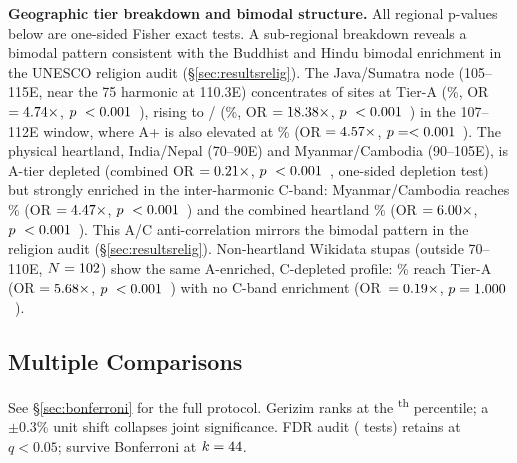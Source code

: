 \textbf{Geographic tier breakdown and bimodal structure.}
All regional p-values below are one-sided Fisher exact tests.
A sub-regional breakdown reveals a bimodal pattern consistent with the
Buddhist and Hindu bimodal enrichment in the UNESCO religion audit (\S\ref{sec:resultsrelig}).
The Java/Sumatra node (105\textdegree--115\textdegree{}E, near the 75\textdegree{} harmonic at 110.3\textdegree{}E)
concentrates \wikiJavaNodeATierN{} of \wikiJavaNodeN{} sites at Tier-A (\wikiJavaNodeATierRate\%, OR $= 4.74\times$, $p~< 0.001$~\wikiJavaNodeATierPSig{}),
rising to \wikiJavaTightATierN/\wikiJavaTightN{} (\wikiJavaTightATierRate\%, OR $= 18.38\times$, $p~< 0.001$~\wikiJavaTightATierPSig{}) in the 107\textdegree--112\textdegree{}E window,
where A+ is also elevated at \wikiJavaTightApRate\% (OR $= 4.57\times$, $p = < 0.001$~\wikiJavaTightApPSig{}).
The physical heartland, India/Nepal (70\textdegree--90\textdegree{}E) and Myanmar/Cambodia
(90\textdegree--105\textdegree{}E), is A-tier depleted (combined OR $= 0.21\times$,
$p~< 0.001$~\wikiHeartlandATierPSig{}, one-sided depletion test)
but strongly enriched in the inter-harmonic C-band:
Myanmar/Cambodia reaches \wikiMyanmarCbandRate\% (OR $= 4.47\times$, $p~< 0.001$~\wikiMyanmarCbandPSig{}) and the
combined heartland \wikiHeartlandCbandRate\% (OR $= 6.00\times$, $p~< 0.001$~\wikiHeartlandCbandPSig{}).
This A/C anti-correlation mirrors the bimodal pattern in the religion audit (\S\ref{sec:resultsrelig}).
Non-heartland Wikidata stupas (outside 70\textdegree--110\textdegree{}E,
$N = 102{}$) show the same A-enriched, C-depleted profile:
\wikiNonHeartlandATierRate\% reach Tier-A (OR $= 5.68\times$, $p~< 0.001$~\wikiNonHeartlandATierPSig{})
with no C-band enrichment (OR~$= 0.19\times$, $p = 1.000$~\wikiNonHeartlandCbandPSig{}).

\subsection{Multiple Comparisons}
\label{sec:multiple_comparisons}

See \S\ref{sec:bonferroni} for the full protocol.
Gerizim ranks at the \anchorSweepPctile{}\textsuperscript{th} percentile;
a $\pm 0.3\%$ unit shift collapses joint significance.
FDR audit (\NtotalTests{} tests) retains \NsurviveFDR{} at $q < 0.05$;
\NsurviveBonfAll{} survive Bonferroni at $k = 44$.

